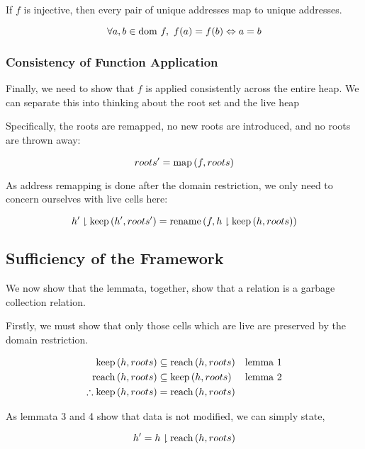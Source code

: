 \begin{lemma}
  If $f$ is injective, then every pair of unique addresses map to
  unique addresses.

  \[\forall a, b \in \mathrm{dom}~f,\ f(a) = f(b) \Leftrightarrow a = b\]
\end{lemma}

\subsubsection{Consistency of Function Application}

Finally, we need to show that $f$ is applied consistently across the
entire \gls{heap}. We can separate this into thinking about the
\gls{root} set and the live \gls{heap}

\begin{lemma}
  Specifically, the roots are remapped, no new roots are introduced,
  and no roots are thrown away:

  \[roots' = \mathrm{map}\left(f, roots\right)\]
\end{lemma}

\begin{lemma}
  As address remapping is done after the domain restriction, we only
  need to concern ourselves with live cells here:

  \[h' \downharpoonright \mathrm{keep}\left(h', roots'\right) = \mathrm{rename}\left(f, h \downharpoonright \mathrm{keep}\left(h, roots\right)\right)\]
\end{lemma}

\subsection{Sufficiency of the Framework}

We now show that the lemmata, together, show that a relation is a
garbage collection relation.

\begin{theorem}
  Firstly, we must show that only those cells which are live are
  preserved by the domain restriction.

  \begin{align*}
    \mathrm{keep}\left(h, roots\right) &\subseteq \mathrm{reach}\left(h, roots\right) & \mbox{lemma 1}\\
    \mathrm{reach}\left(h, roots\right) &\subseteq \mathrm{keep}\left(h, roots\right) & \mbox{lemma 2}\\
    \therefore \mathrm{keep}\left(h, roots\right) &= \mathrm{reach}\left(h, roots\right)
  \end{align*}

  As lemmata 3 and 4 show that data is not modified, we can simply state,

  \[h' = h \downharpoonright \mathrm{reach}\left(h, roots\right)\]
\end{theorem}

